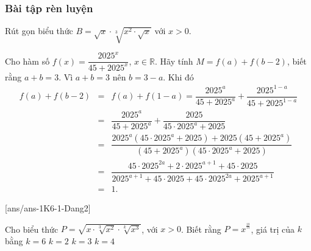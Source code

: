\subsubsection{Bài tập rèn luyện}
\centerline{}
\begin{bt}%
	Rút gọn biểu thức $B=\sqrt{x}\cdot \sqrt[3]{x^2\cdot \sqrt{x}}$ với $x>0$.
\end{bt}

\begin{bt}%
	Cho hàm số $f(x)=\dfrac{2025^x}{45+2025^x}$, $x\in \mathbb{R}$. Hãy tính $M=f(a)+f(b-2)$, biết rằng $a+b=3$.
	\loigiai
	{Vì $a+b=3$ nên $b=3-a$. Khi đó
		\allowdisplaybreaks
		\begin{eqnarray*}
			f(a)+f(b-2) &=& f(a)+f(1-a)= \dfrac{2025^a}{45+2025^a}+\dfrac{2025^{1-a}}{45+2025^{1-a}}\\
			&=& \dfrac{2025^a}{45+2025^a}+\dfrac{2025}{45\cdot 2025^a+2025}\\
			&=& \dfrac{2025^a\left(45\cdot 2025^a+2025\right) + 2025\left(45+2025^a\right)}{\left(45+2025^a\right)\left(45\cdot 2025^a+2025\right)}\\
			&=& \dfrac{45\cdot 2025^{2a}+2\cdot 2025^{a+1}+45\cdot 2025}{2025^{a+1}+45\cdot 2025+45\cdot 2025^{2a}+2025^{a+1}}\\
			&=& 1.
		\end{eqnarray*}
	}
\end{bt}
\centerline{}
[ans/ans-1K6-1-Dang2]

\begin{ex}%
	Cho biểu thức $P=\sqrt{x\cdot \sqrt[3]{x^2}\cdot \sqrt[k]{x^3}}$, với $x>0$. Biết rằng $P=x^{^{\tfrac{23}{24}}}$, giá trị của $k$ bằng
	\choice
	{$k=6$}
	{$k=2$}
	{$k=3$}
	{\True $k=4$}
\end{ex}

